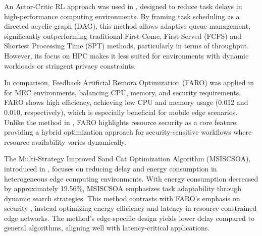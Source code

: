 \documentclass[a4paper, final]{article}
\begin{document}



An Actor-Critic RL approach was used in \cite{bib:1_acrl}, designed to reduce task delays in high-performance 
computing environments. By framing task scheduling as a directed acyclic graph (DAG), this method allows 
adaptive queue management, significantly outperforming traditional First-Come, First-Served (FCFS) and 
Shortest Processing Time (SPT) methods, particularly in terms of throughput. However, its focus on HPC makes 
it less suited for environments with dynamic workloads or stringent privacy constraints.

In comparison, Feedback Artificial Remora Optimization (FARO) was applied in \cite{bib:2_faro} for MEC 
environments, balancing CPU, memory, and security requirements. FARO shows high efficiency, achieving low 
CPU and memory usage (0.012 and 0.010, respectively), which is especially beneficial for mobile edge scenarios.
Unlike the method in \cite{bib:1_acrl}, FARO highlights resource security as a core feature, providing a 
hybrid optimization approach for security-sensitive workflows where resource availability varies dynamically.

The Multi-Strategy Improved Sand Cat Optimization Algorithm (MSISCSOA), introduced in \cite{bib:3_sandcat}, 
focuses on reducing delay and energy consumption in heterogeneous edge computing environments. With energy 
consumption decreased by approximately 19.56\%, MSISCSOA emphasizes task adaptability through dynamic search 
strategies. This method contrasts with FARO’s emphasis on security \cite{bib:2_faro}, instead optimizing 
energy efficiency and latency in resource-constrained edge networks. The method’s edge-specific design yields 
lower delay compared to general algorithms, aligning well with latency-critical applications.
\end{document}
